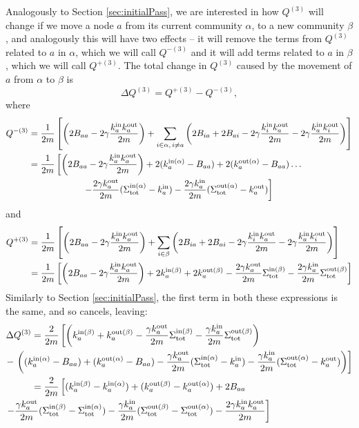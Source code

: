 \documentclass{article}
\begin{document}
Analogously to Section \ref{sec:initialPass}, we are interested in how 
$Q^{(3)}$ will change if we move a node $a$ from its 
current community $\alpha$, to a new community $\beta$, 
and analogously this will have two effects -- it will remove the terms 
from $Q^{(3)}$ related to $a$ in $\alpha$, which we will call $Q^{-(3)}$ 
and it will add terms related to $a$ in $\beta$, which we will call $Q^{+(3)}$. 
The total change in $Q^{(3)}$ caused by the movement of $a$ from $\alpha$ to $\beta$ is 
\begin{equation}
	\Delta Q^{(3)} = Q^{+(3)} - Q^{-(3)},
\end{equation}
where
\begin{align*}
Q^{-(3)} &= \frac{1}{2m}\left[ \left( 2B_{aa} - 2\gamma \frac{k_{a}^{\text{in}}k_{a}^{\text{out}}}{2m} \right) 
+ \sum_{i \in \alpha, \, i \neq a} \left( 2B_{ia} + 2B_{ai} - 2\gamma \frac{k_{i}^{\text{in}}k_{a}^{\text{out}}}{2m} - 2\gamma \frac{k_{a}^{\text{in}}k_{i}^{\text{out}}}{2m} \right) \right] \\
				 &= \frac{1}{2m}\left[ \left( 2B_{aa} - 2\gamma \frac{k_{a}^{\text{in}}k_{a}^{\text{out}}}{2m} \right) 
+ 2(k_{a}^{\text{in}(\alpha)} - B_{aa}) + 2(k_{a}^{\text{out}(\alpha)} - B_{aa}) \hdots \right . \\
 & \quad \quad \quad \quad \quad \quad \left .
- \frac{2\gamma k_{a}^{\text{out}}}{2m} (\Sigma_{\text{tot}}^{\text{in}(\alpha)} - k_{a}^{\text{in}}) - \frac{2\gamma k_{a}^{\text{in}}}{2m} (\Sigma_{\text{tot}}^{\text{out}(\alpha)} - k_{a}^{\text{out}}) \right] \\
\end{align*}
and
\begin{align*}
Q^{+(3)} &= \frac{1}{2m}\left[ \left( 2B_{aa} - 2\gamma \frac{k_{a}^{\text{in}}k_{a}^{\text{out}}}{2m} \right) 
+ \sum_{i \in \beta} \left( 2B_{ia} + 2B_{ai} - 2\gamma \frac{k_{i}^{\text{in}}k_{a}^{\text{out}}}{2m} - 2\gamma \frac{k_{a}^{\text{in}}k_{i}^{\text{out}}}{2m} \right) \right] \\
				 &= \frac{1}{2m}\left[ \left( 2B_{aa} - 2\gamma \frac{k_{a}^{\text{in}}k_{a}^{\text{out}}}{2m} \right) 
+ 2k_{a}^{\text{in}(\beta)} + 2k_{a}^{\text{out}(\beta)} - \frac{2\gamma k_{a}^{\text{out}}}{2m} \Sigma_{\text{tot}}^{\text{in}(\beta)}  - \frac{2\gamma k_{a}^{\text{in}}}{2m} \Sigma_{\text{tot}}^{\text{out}(\beta)} \right] \\
\end{align*}
Similarly to Section \ref{sec:initialPass}, the first term in both these expressions is the same, and so cancels, leaving:
\begin{align*}
\Delta Q^{(3)} &= \frac{2}{2m}\left[ 
\left( \dinkin{a}{\beta} + \doutkin{a}{\beta} - \frac{\gamma\dkout{a}}{2m} \dinStot{\beta}  - \frac{\gamma\dkin{a}}{2m} \doutStot{\beta} \right) \right. \\
& \hspace{-1cm}
- \left. \left( (\dinkin{a}{\alpha} - B_{aa}) + (\doutkin{a}{\alpha} - B_{aa}) - \frac{\gamma\dkout{a}}{2m} (\dinStot{\alpha} - \dkin{a}) - \frac{\gamma\dkin{a}}{2m} (\doutStot{\alpha} - \dkout{a})  \right) \right] \\
 &= \frac{2}{2m}\left[ (\dinkin{a}{\beta}-\dinkin{a}{\alpha}) + (\doutkin{a}{\beta}-\doutkin{a}{\alpha}) + 2B_{aa} \right. \\
& \hspace{-1cm} \left.
- \frac{\gamma\dkout{a}}{2m} (\dinStot{\beta}-\dinStot{\alpha}) - \frac{\gamma\dkin{a}}{2m} (\doutStot{\beta} - \doutStot{\alpha}) - \frac{2\gamma\dkin{a}\dkout{a}}{2m} \right]
\end{align*}
\end{document}
